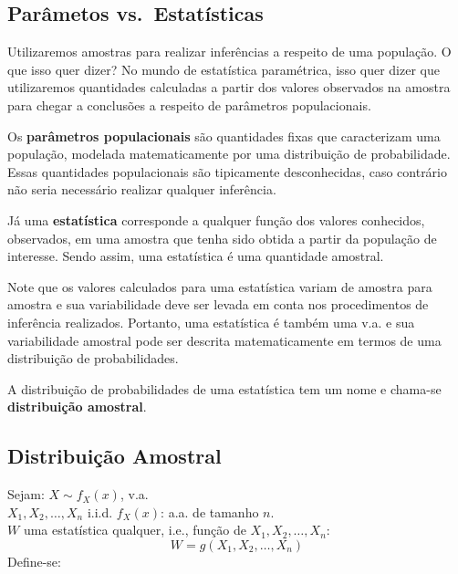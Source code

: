 \documentclass[
]{book}
\theoremstyle{definition}
\theoremstyle{definition}
\theoremstyle{definition}
\theoremstyle{remark}
\begin{document}
\hypertarget{paruxe2metos-vs.-estatuxedsticas}{%
\subsection*{Parâmetos vs.~Estatísticas}\label{paruxe2metos-vs.-estatuxedsticas}}

Utilizaremos amostras para realizar inferências a respeito de uma população. O que isso quer dizer?
No mundo de estatística paramétrica, isso quer dizer que utilizaremos quantidades calculadas a partir dos valores observados na amostra para chegar a conclusões a respeito de parâmetros populacionais.

Os \textbf{parâmetros populacionais} são quantidades fixas que caracterizam uma população, modelada matematicamente por uma distribuição de probabilidade. Essas quantidades populacionais são tipicamente desconhecidas, caso contrário não seria necessário realizar qualquer inferência.

Já uma \textbf{estatística} corresponde a qualquer função dos valores conhecidos, observados, em uma amostra que tenha sido obtida a partir da população de interesse. Sendo assim, uma estatística é uma quantidade amostral.

Note que os valores calculados para uma estatística variam de amostra para amostra e sua variabilidade deve ser levada em conta nos procedimentos de inferência realizados. Portanto, uma estatística é também uma v.a. e sua variabilidade amostral pode ser descrita matematicamente em termos de uma distribuição de probabilidades.

A distribuição de probabilidades de uma estatística tem um nome e chama-se \textbf{distribuição amostral}.

\hypertarget{distribuiuxe7uxe3o-amostral}{%
\subsection*{Distribuição Amostral}\label{distribuiuxe7uxe3o-amostral}}

Sejam:
\(X \sim f_X(x)\), v.a.\\
\(X_1, X_2, \ldots, X_n\) i.i.d. \(f_X(x)\): a.a. de tamanho \(n\).\\
\(W\) uma estatística qualquer, i.e., função de \(X_1, X_2, \ldots, X_n\):\\
\[W = g (X_1, X_2, \ldots, X_n)\]
Define-se:
\end{document}
